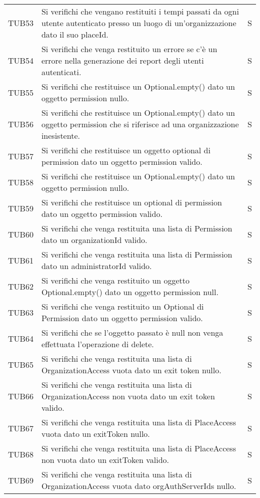 {\begin{longtable}{ c C{13cm} C{1cm}}
TUB53 & Si verifichi che vengano restituiti i tempi passati da ogni utente autenticato presso un luogo di un'organizzazione dato il suo placeId. & S \\
TUB54 & Si verifichi che venga restituito un errore se c'è un errore nella generazione dei report degli utenti autenticati. & S \\
TUB55 & Si verifichi che restituisce un Optional.empty() dato un oggetto permission nullo. & S \\
TUB56 & Si verifichi che restituisce un Optional.empty() dato un oggetto permission che si riferisce ad una organizzazione inesistente. & S \\
TUB57 & Si verifichi che restituisce un oggetto optional di permission dato un oggetto permission valido. & S \\
TUB58 & Si verifichi che restituisce un Optional.empty() dato un oggetto permission nullo. & S \\
TUB59 & Si verifichi che restituisce un optional di permission dato un oggetto permission valido. & S \\
TUB60 & Si verifichi che venga restituita una lista di Permission dato un organizationId valido. & S \\
TUB61 & Si verifichi che venga restituita una lista di Permission dato un administratorId valido. & S \\
TUB62 & Si verifichi che venga restituito un oggetto Optional.empty() dato un oggetto permission null. & S \\
TUB63 & Si verifichi che venga restituito un Optional di Permission dato un oggetto permission valido. & S \\
TUB64 & Si verifichi che se l'oggetto passato è null non venga effettuata l'operazione di delete. & S \\
TUB65 & Si verifichi che venga restituita una lista di OrganizationAccess vuota dato un exit token nullo. & S \\
TUB66 & Si verifichi che venga restituita una lista di OrganizationAccess non vuota dato un exit token valido. & S \\
TUB67 & Si verifichi che venga restituita una lista di PlaceAccess vuota dato un exitToken nullo. & S \\
TUB68 & Si verifichi che venga restituita una lista di PlaceAccess non vuota dato un exitToken valido. & S \\
TUB69 & Si verifichi che venga restituita una lista di OrganizationAccess vuota dato orgAuthServerIds nullo. & S \\

\end{longtable}}

